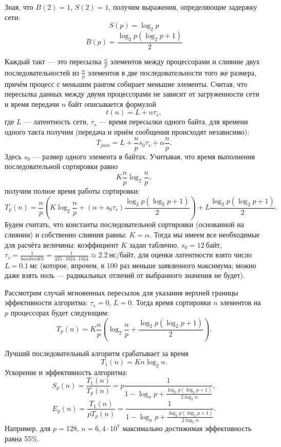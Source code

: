 \documentclass[14pt]{extarticle}
\begin{document}
Зная, что $B(2) = 1$, $S(2) = 1$, получим выражения, определяющие задержку сети:
\begin{equation*}
S(p) = \log_2 p
\end{equation*}
\begin{equation*}
B(p) = \frac{\log_2 p \left( \log_2 p + 1 \right)}{2}
\end{equation*}

Каждый такт --- это пересылка $\frac{n}{p}$ элементов между процессорами и слияние двух последовательностей из $\frac{n}{p}$ элементов в две последовательности того же размера, причём процесс с меньшим рангом собирает меньшие элементы. Считая, что пересылка данных между двумя процессорами не зависит от загруженности сети и время передачи $n$ байт описывается формулой
$$ t(n) = L + n \tau_s, $$
где $L$ --- латентность сети, $\tau_s$ --- время пересылки одного байта, для времени одного такта получим (передача и приём сообщения происходят независимо):
$$ T_{join} = L + \frac{n}{p} s_0 \tau_s + \alpha \frac{n}{p}.$$
Здесь $s_0$ --- размер одного элемента в байтах. Учитывая, что время выполнения последовательной сортировки равно
$$K \frac{n}{p} \log_2 \frac{n}{p},$$
получим полное время работы сортировки:
\begin{equation*}
T_p(n) = \frac{n}{p} \left( K \log_2 \frac{n}{p} + (\alpha + s_0\tau_s) \frac{\log_2 p (\log_2 p + 1)}{2} \right) + L \frac{\log_2 p (\log_2 p + 1)}{2}.
\end{equation*}
Будем считать, что константы последовательной сортировки (основанной на слиянии) и собственно слияния равны: $ K = \alpha $.
Тогда мы имеем все необходимые для расчёта величины: коэффициент $K$ задан таблично, $s_0 = 12 ~ \text{байт}$, $\tau_s = \frac{1}{bandwidth} = \frac{1}{425 \cdot 1024 \cdot 1024} \approx 2.2 ~ \text{нс/байт}$, для оценки латентности взято число $L = 0.1 ~ \text{мс}$ (которое, впрочем, в 100 раз меньше заявленного максимума; можно даже взять ноль --- радикальных отличий от выбранного значения не будет).

Рассмотрим случай мгновенных пересылок для указания верхней границы эффективности алгоритма: $ \tau_s = 0 $, $ L = 0 $. Тогда время сортировки $n$ элементов на $p$ процессорах будет следующим:
\begin{equation*}
T_p(n) = K \frac{n}{p} \left( \log_2 \frac{n}{p} + \frac{\log_2 p (\log_2 p + 1)}{2} \right).
\end{equation*}

Лучший последовательный алгоритм срабатывает за время
$$ T_1(n) = K n \log_2 n.$$
Ускорение и эффективность алгоритма:
\begin{equation*}
S_p(n) = \frac{T_1(n)}{T_p(n)} = p \frac{1}{1 - \log_n p + \frac{\log_2 p (\log_2 p + 1)}{2 \log_2 n}},
\end{equation*}
\begin{equation*}
E_p(n) = \frac{T_1(n)}{pT_p(n)} = \frac{1}{1 - \log_n p + \frac{\log_2 p (\log_2 p + 1)}{2 \log_2 n}}.
\end{equation*}
Например, для $p=128$, $n=6,4 \cdot 10^7$ максимально достижимая эффективность равна 55\%.
\end{document}
